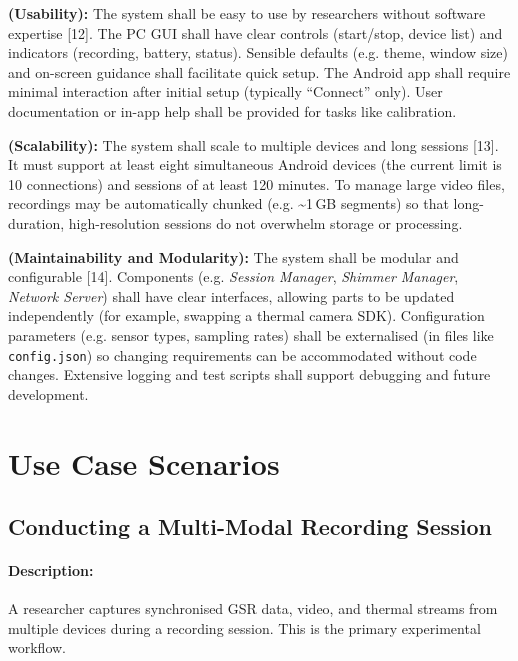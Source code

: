 \begin{description}[style=unboxed,leftmargin=0cm]
	\item[\textbf{NFR6}] \textbf{(Usability):} The system shall be easy to use by researchers without software expertise [12]. The PC GUI shall have clear controls (start/stop, device list) and indicators (recording, battery, status). Sensible defaults (e.g. theme, window size) and on-screen guidance shall facilitate quick setup. The Android app shall require minimal interaction after initial setup (typically “Connect” only). User documentation or in-app help shall be provided for tasks like calibration.

	\item[\textbf{NFR7}] \textbf{(Scalability):} The system shall scale to multiple devices and long sessions [13]. It must support at least eight simultaneous Android devices (the current limit is 10 connections) and sessions of at least 120 minutes. To manage large video files, recordings may be automatically chunked (e.g. \textasciitilde1\,GB segments) so that long-duration, high-resolution sessions do not overwhelm storage or processing.

	\item[\textbf{NFR8}] \textbf{(Maintainability and Modularity):} The system shall be modular and configurable [14]. Components (e.g. \textit{Session Manager}, \textit{Shimmer Manager}, \textit{Network Server}) shall have clear interfaces, allowing parts to be updated independently (for example, swapping a thermal camera SDK). Configuration parameters (e.g. sensor types, sampling rates) shall be externalised (in files like \texttt{config.json}) so changing requirements can be accommodated without code changes. Extensive logging and test scripts shall support debugging and future development.
\end{description}


\section{Use Case Scenarios}

\subsection{Conducting a Multi-Modal Recording Session}

\paragraph{Description:} A researcher captures synchronised GSR data, video, and thermal streams from multiple devices during a recording session. This is the primary experimental workflow.

